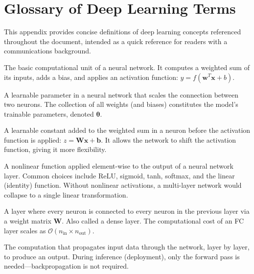 \chapter{Glossary of Deep Learning Terms}
\label{app:dl_glossary}

This appendix provides concise definitions of deep learning concepts referenced throughout the document, intended as a quick reference for readers with a communications background.

\begin{description}[style=nextline, font=\normalfont\bfseries, leftmargin=1.5em]

      \item[Neuron]
            The basic computational unit of a neural network. It computes a weighted sum of its inputs, adds a bias, and applies an activation function: $y = f(\bm{w}^T \bm{x} + b)$.

      \item[Weight]
            A learnable parameter in a neural network that scales the connection between two neurons. The collection of all weights (and biases) constitutes the model's trainable parameters, denoted $\bm{\theta}$.

      \item[Bias]
            A learnable constant added to the weighted sum in a neuron before the activation function is applied: $z = \bm{W}\bm{x} + \bm{b}$. It allows the network to shift the activation function, giving it more flexibility.

      \item[Activation Function]
            A nonlinear function applied element-wise to the output of a neural network layer. Common choices include ReLU, sigmoid, tanh, softmax, and the linear (identity) function. Without nonlinear activations, a multi-layer network would collapse to a single linear transformation.

      \item[Fully Connected (FC) Layer]
            A layer where every neuron is connected to every neuron in the previous layer via a weight matrix $\bm{W}$. Also called a dense layer. The computational cost of an FC layer scales as $\mathcal{O}(n_{\mathrm{in}} \times n_{\mathrm{out}})$.

      \item[Forward Pass]
            The computation that propagates input data through the network, layer by layer, to produce an output. During inference (deployment), only the forward pass is needed---backpropagation is not required.


\end{description}
